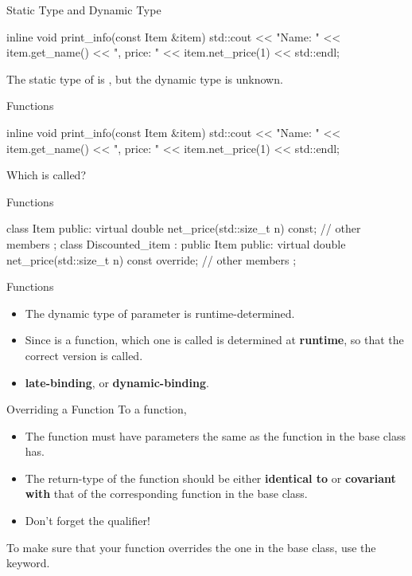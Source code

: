 \documentclass{beamer}
\begin{document}
\begin{frame}[fragile]{Static Type and Dynamic Type}
    \begin{cpp}
inline void print_info(const Item &item) {
  std::cout << "Name: " << item.get_name()
            << ", price: " << item.net_price(1)
            << std::endl;
}
    \end{cpp}
    The static type of  is \const{}, but the dynamic type is unknown.
\end{frame}

\begin{frame}[fragile]{\virtual Functions}
    \begin{cpp}
inline void print_info(const Item &item) {
  std::cout << "Name: " << item.get_name()
            << ", price: " << item.net_price(1)
            << std::endl;
}
    \end{cpp}
    Which  is called?
\end{frame}

\begin{frame}[fragile]{\virtual Functions}
    \begin{cpp}
class Item {
 public:
  virtual double net_price(std::size_t n) const;
  // other members
};
class Discounted_item : public Item {
 public:
  virtual double net_price(std::size_t n) const override;
  // other members
};
    \end{cpp}
\end{frame}

\begin{frame}{\virtual Functions}
    \begin{itemize}
        \item The dynamic type of parameter  is runtime-determined.
        \item Since  is a \virtual function, which one is called is determined at \textbf{runtime}, so that the correct version is called.
        \item \textbf{late-binding}, or \textbf{dynamic-binding}.
    \end{itemize}
\end{frame}

\begin{frame}{Overriding a \virtual Function}
    To \override a \virtual function,
    \begin{itemize}
        \item The function must have parameters the same as the function in the base class has.
        \item The return-type of the function should be either \textbf{identical to} or \textbf{covariant with}  that of the corresponding function in the base class.
        \item Don't forget the \const qualifier!
    \end{itemize}
    To make sure that your function overrides the one in the base class, use the \override keyword.
\end{frame}
\end{document}
